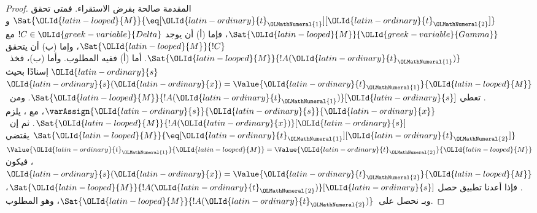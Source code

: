 \documentclass[../../../include/open-logic-section]{subfiles}
\begin{document}
\begin{proof}
المقدمة صالحة بفرض الاستقراء. فمتى تحقق
$\Sat{{\OLId{latin-looped}{M}}}{\eq[{\OLId{latin-ordinary}{t}}_{\OLMathNumeral{1}}][{\OLId{latin-ordinary}{t}}_{\OLMathNumeral{2}}]}$ و$\Sat{{\OLId{latin-looped}{M}}}{{\OLId{greek-variable}{Gamma}}}$، فإما (أ) أن يوجد
$!C \in {\OLId{greek-variable}{Delta}}$ مع $\Sat{{\OLId{latin-looped}{M}}}{!C}$، وإما (ب) أن يتحقق
$\Sat{{\OLId{latin-looped}{M}}}{!A({\OLId{latin-ordinary}{t}}_{\OLMathNumeral{1}})}$. أما (أ) ففيه المطلوب.
وأما (ب)، فخذ~${\OLId{latin-ordinary}{s}}$ إسنادًا بحيث ${\OLId{latin-ordinary}{s}}({\OLId{latin-ordinary}{x}}) = \Value{{\OLId{latin-ordinary}{t}}_{\OLMathNumeral{1}}}{{\OLId{latin-looped}{M}}}$.
تعطي 
$\Sat{{\OLId{latin-looped}{M}}}{!A({\OLId{latin-ordinary}{t}}_{\OLMathNumeral{1}})}[{\OLId{latin-ordinary}{s}}]$. ومن~$\varAssign{{\OLId{latin-ordinary}{s}}}{{\OLId{latin-ordinary}{s}}}{{\OLId{latin-ordinary}{x}}}$، مع
، يلزم
$\Sat{{\OLId{latin-looped}{M}}}{!A({\OLId{latin-ordinary}{x}})}[{\OLId{latin-ordinary}{s}}]$.
ثم إن~$\Sat{{\OLId{latin-looped}{M}}}{\eq[{\OLId{latin-ordinary}{t}}_{\OLMathNumeral{1}}][{\OLId{latin-ordinary}{t}}_{\OLMathNumeral{2}}]}$ يقتضي
$\Value{{\OLId{latin-ordinary}{t}}_{\OLMathNumeral{1}}}{{\OLId{latin-looped}{M}}} = \Value{{\OLId{latin-ordinary}{t}}_{\OLMathNumeral{2}}}{{\OLId{latin-looped}{M}}}$، فيكون
${\OLId{latin-ordinary}{s}}({\OLId{latin-ordinary}{x}}) = \Value{{\OLId{latin-ordinary}{t}}_{\OLMathNumeral{2}}}{{\OLId{latin-looped}{M}}}$.
فإذا أعدنا تطبيق  حصل
$\Sat{{\OLId{latin-looped}{M}}}{!A({\OLId{latin-ordinary}{t}}_{\OLMathNumeral{2}})}[{\OLId{latin-ordinary}{s}}]$، وبـ
 نحصل على~$\Sat{{\OLId{latin-looped}{M}}}{!A({\OLId{latin-ordinary}{t}}_{\OLMathNumeral{2}})}$، وهو المطلوب.
\end{proof}
\end{document}
